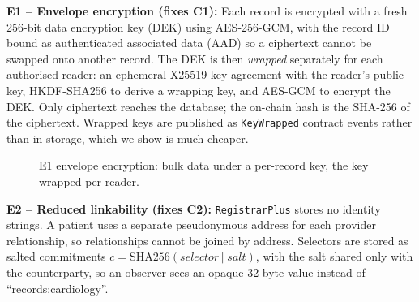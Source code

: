 \documentclass[11pt,a4paper]{article}
\begin{document}
\textbf{E1 -- Envelope encryption (fixes C1):} Each record is encrypted with a
fresh 256-bit data encryption key (DEK) using AES-256-GCM, with the record ID bound
as authenticated associated data (AAD) so a ciphertext cannot be swapped onto
another record. The DEK is then \emph{wrapped} separately for each authorised
reader: an ephemeral X25519 key agreement with the reader's public key, HKDF-SHA256
to derive a wrapping key, and AES-GCM to encrypt the DEK. Only ciphertext reaches
the database; the on-chain hash is the SHA-256 of the ciphertext. Wrapped keys are
published as \texttt{KeyWrapped} contract events rather than in storage, which we
show is much cheaper.

\begin{figure}[H]
\centering
{}
\caption{E1 envelope encryption: bulk data under a per-record key, the key wrapped per reader.}
\label{fig:envelope}
\end{figure}


\textbf{E2 -- Reduced linkability (fixes C2):} \texttt{RegistrarPlus} stores no
identity strings. A patient uses a separate pseudonymous address for each provider
relationship, so relationships cannot be joined by address. Selectors are stored as
salted commitments $c = \mathrm{SHA256}(\mathit{selector}\,\Vert\,\mathit{salt})$,
with the salt shared only with the counterparty, so an observer sees an opaque
32-byte value instead of ``records:cardiology''.
\end{document}
